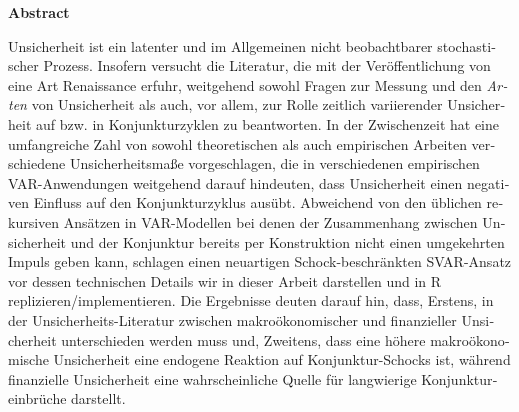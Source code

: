 \documentclass[a4paper,11pt,listof=nochaptergap,oneside,pointednumbers,bibtotoc,bigheadings,liststotoc]{scrbook}
\makeatletter
\theoremstyle{mysatz}
\theoremstyle{mydefinition}
\theoremstyle{mytheorem}
\theoremstyle{mybemerkung}
\newcommand\abstractname{Abstract}  %
\newenvironment{abstract}{%
      \titlepage
      \null\vfil
      \@beginparpenalty\@lowpenalty
      \begin{center}%
        \bfseries \abstractname
        \@endparpenalty\@M
      \end{center}}%
     {\par\vfil\null\endtitlepage}
\newenvironment{abstract}{%
      \if@twocolumn
        \section*{\abstractname}%
      \else
        \small
        \begin{center}%
          {\bfseries \abstractname\vspace{-.5em}\vspace{\z@}}%
        \end{center}%
        \quotation
      \fi}
      {\if@twocolumn\else\endquotation\fi}
\makeatother
\begin{document}
\begin{otherlanguage}{ngerman}
\begin{abstract}
Unsicherheit ist ein latenter und im Allgemeinen nicht beobachtbarer stochastischer Prozess. Insofern versucht die Literatur, die mit der Veröffentlichung von \citet{bloom:09} eine Art Renaissance erfuhr, weitgehend sowohl Fragen zur Messung und den \textit{Arten} von Unsicherheit als auch, vor allem, zur Rolle zeitlich variierender Unsicherheit auf bzw. in Konjunkturzyklen zu beantworten. In der Zwischenzeit hat eine umfangreiche Zahl von sowohl theoretischen als auch empirischen Arbeiten verschiedene Unsicherheitsmaße vorgeschlagen, die in verschiedenen empirischen VAR-Anwendungen weitgehend darauf hindeuten, dass Unsicherheit einen negativen Einfluss auf den Konjunkturzyklus ausübt. Abweichend von den üblichen rekursiven Ansätzen in VAR-Modellen bei denen der Zusammenhang zwischen Unsicherheit und der Konjunktur bereits per Konstruktion nicht einen umgekehrten Impuls geben kann, schlagen \citet{ludvigsonetal:18} einen neuartigen Schock-beschränkten SVAR-Ansatz vor dessen technischen Details wir in dieser Arbeit darstellen und in R replizieren/implementieren. Die Ergebnisse deuten darauf hin, dass, Erstens, in der Unsicherheits-Literatur zwischen makroökonomischer und finanzieller Unsicherheit unterschieden werden muss und, Zweitens, dass eine höhere makroökonomische Unsicherheit eine endogene Reaktion auf Konjunktur-Schocks ist, während finanzielle Unsicherheit eine wahrscheinliche Quelle für langwierige Konjunktureinbrüche darstellt.
\end{abstract}
\end{otherlanguage}






\restoregeometry

\thispagestyle{empty}
\pagestyle{fancy} %
\setcounter{page}{7} %
\tableofcontents
\newpage
\listoffigures

\newpage
\listoftables

\newpage

\end{document}
